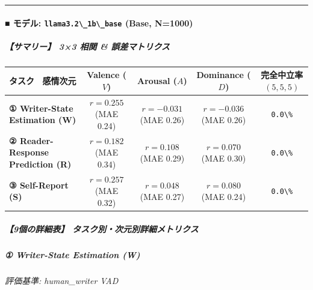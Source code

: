 \vspace{0.5em}\hrule\vspace{0.5em}

\paragraph{■ モデル: \texttt{llama3.2\textbackslash{}\_1b\textbackslash{}\_base} (Base, N=1000)}

\subparagraph{【サマリー】 3×3 相関 \& 誤差マトリクス}
\begin{center}
\small
\begin{tabular}{lcccc}
\toprule
\textbf{タスク \ 感情次元} & \textbf{Valence ($V$)} & \textbf{Arousal ($A$)} & \textbf{Dominance ($D$)} & \textbf{完全中立率 $(5,5,5)$} \\
\midrule
\textbf{① Writer-State Estimation (W)} & \textbf{$r=0.255$} (MAE 0.24) & \textbf{$r=-0.031$} (MAE 0.26) & \textbf{$r=-0.036$} (MAE 0.26) & \texttt{0.0\textbackslash{}\%} \\
\textbf{② Reader-Response Prediction (R)} & \textbf{$r=0.182$} (MAE 0.34) & \textbf{$r=0.108$} (MAE 0.29) & \textbf{$r=0.070$} (MAE 0.30) & \texttt{0.0\textbackslash{}\%} \\
\textbf{③ Self-Report (S)} & \textbf{$r=0.257$} (MAE 0.32) & \textbf{$r=0.048$} (MAE 0.27) & \textbf{$r=0.080$} (MAE 0.24) & \texttt{0.0\textbackslash{}\%} \\
\bottomrule
\end{tabular}
\end{center}



\subparagraph{【9個の詳細表】 タスク別・次元別詳細メトリクス}

\subparagraph{① Writer-State Estimation (W)}
\textit{評価基準: human\_writer VAD}

